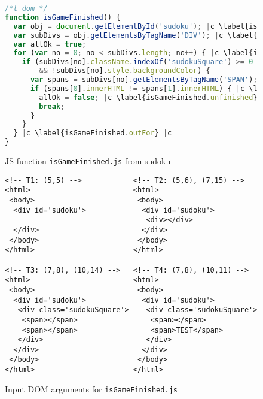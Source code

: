 \documentclass[sigconf,review,anonymous]{acmart}
\begin{document}
\begin{figure}[t]
  \begin{lstlisting}[style=htmlcssjs,language=JavaScript]
/*t dom */
function isGameFinished() {
  var obj = document.getElementById('sudoku'); |c \label{isGameFinished.getSudoku} |c
  var subDivs = obj.getElementsByTagName('DIV'); |c \label{isGameFinished.getDivs} |c
  var allOk = true;
  for (var no = 0; no < subDivs.length; no++) { |c \label{isGameFinished.inFor.begin} |c
    if (subDivs[no].className.indexOf('sudokuSquare') >= 0 |c \label{isGameFinished.if1.begin} |c 
        && !subDivs[no].style.backgroundColor) { 
      var spans = subDivs[no].getElementsByTagName('SPAN');
      if (spans[0].innerHTML != spans[1].innerHTML) { |c \label{isGameFinished.if2.begin} |c
        allOk = false; |c \label{isGameFinished.unfinished} |c
        break; 
      }
    }
  } |c \label{isGameFinished.outFor} |c
}
\end{lstlisting}
  \caption{JS function \texttt{isGameFinished.js} from sudoku}
  \label{code.isGameFinished}
\end{figure}

\begin{figure}[t]
  \begin{lstlisting}[style=htmlcssjs, language=HTML5]
<!-- T1: (5,5) -->            <!-- T2: (5,6), (7,15) -->
<html>                        <html>
 <body>                        <body>
  <div id='sudoku'>             <div id='sudoku'>
                                 <div></div>                           
  </div>                        </div> 
 </body>                       </body>    
</html>                       </html>  

<!-- T3: (7,8), (10,14) -->   <!-- T4: (7,8), (10,11) -->
<html>                        <html>
 <body>                        <body>
  <div id='sudoku'>             <div id='sudoku'>
   <div class='sudokuSquare'>    <div class='sudokuSquare'>
    <span></span>                 <span></span> 
    <span></span>                 <span>TEST</span>
   </div>                        </div> 
  </div>                        </div>
 </body>                       </body>
</html>                       </html>
  \end{lstlisting}
  \caption{Input DOM arguments for \texttt{isGameFinished.js}}
  \label{fig.isGameFinished.tests}
\end{figure}
\end{document}
